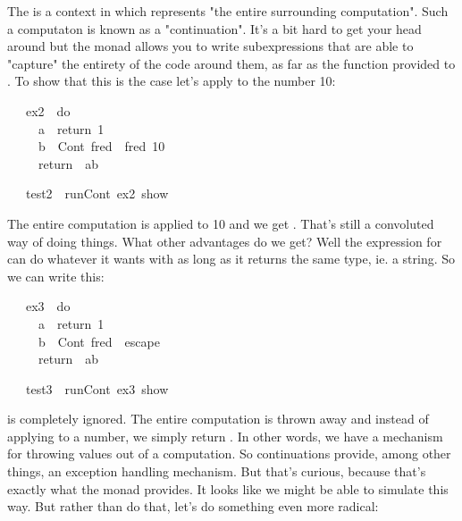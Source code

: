 \documentclass[12pt]{article}
\begin{document}
The  is a context in which  represents "the entire surrounding computation". Such a computaton is known as a "continuation". It's a bit hard to get your head around but the  monad allows you to write subexpressions that are able to "capture" the entirety of the code around them, as far as the function provided to . To show that this is the case let's apply  to the number 10:
\begin{tabbing}\ttfamily
~~~ex2~~do\\
\ttfamily ~~~~~a~~return~1\\
\ttfamily ~~~~~b~~Cont~fred~~fred~10\\
\ttfamily ~~~~~return~~ab
\end{tabbing}
\begin{tabbing}\ttfamily
~~~test2~~runCont~ex2~show
\end{tabbing}
The entire computation is applied to 10 and we get . That's still a convoluted way of doing things. What other advantages do we get? Well the expression for  can do whatever it wants with  as long as it returns the same type, ie. a string. So we can write this:
\begin{tabbing}\ttfamily
~~~ex3~~do\\
\ttfamily ~~~~~a~~return~1\\
\ttfamily ~~~~~b~~Cont~fred~~escape\\
\ttfamily ~~~~~return~~ab
\end{tabbing}
\begin{tabbing}\ttfamily
~~~test3~~runCont~ex3~show
\end{tabbing}
 is completely ignored. The entire computation is thrown away and instead of applying  to a number, we simply return . In other words, we have a mechanism for throwing values out of a computation. So continuations provide, among other things, an exception handling mechanism. But that's curious, because that's exactly what the  monad provides. It looks like we might be able to simulate  this way. But rather than do that, let's do something even more radical:
\end{document}
